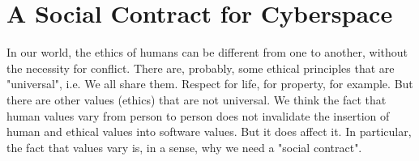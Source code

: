 \chapter{A Social Contract for Cyberspace}
In our world, the ethics of humans can be different from one to another, without the necessity for conflict. There are, probably, some ethical principles that are "universal", i.e. We all share them. Respect for life, for property, for example. But there are other values (ethics) that are not universal. We think the fact that human values vary from person to person does not invalidate the insertion of human and ethical values into software values. But it does affect it. In particular, the fact that values vary is, in a sense, why we need a "social contract".

